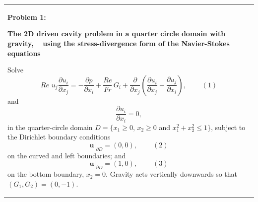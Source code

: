 \begin{center} \tabulinesep=1mm
\begin{longtabu} spread 0pt [c]{*{1}{|X[-1]}|}
\hline
\begin{center} {\bfseries Problem 1\+:}\end{center} 

\begin{center}{\bfseries The 2D driven cavity problem in a quarter circle domain with gravity, ~\newline
 using the stress-\/divergence form of the Navier-\/\+Stokes equations}\end{center} 

\begin{center}\end{center}  Solve \[ Re\phantom{i}u_j\frac{\partial u_i}{\partial x_j} = - \frac{\partial p}{\partial x_i} + \frac{Re}{Fr} \, G_i + \frac{\partial }{\partial x_j} \left( \frac{\partial u_i}{\partial x_j} + \frac{\partial u_j}{\partial x_i} \right), \ \ \ \ \ \ \ \ \ \ (1) \] and \[ \frac{\partial u_i}{\partial x_i} = 0, \] in the quarter-\/circle domain $ D = \{x_1 \geq 0 $, $ x_2 \geq 0 $ and $ x_1^2+x_2^2 \leq 1 \} $, subject to the Dirichlet boundary conditions \[ \left. \mathbf{u}\right|_{\partial D}=(0,0), \ \ \ \ \ \ \ \ \ \ (2) \] on the curved and left boundaries; and \[ \left. \mathbf{u}\right|_{\partial D}=(1,0), \ \ \ \ \ \ \ \ \ \ (3) \] on the bottom boundary, $ x_2 = 0 $. Gravity acts vertically downwards so that $ (G_1, G_2) = (0,-1) $.

\\
\end{longtabu}
\end{center} 

